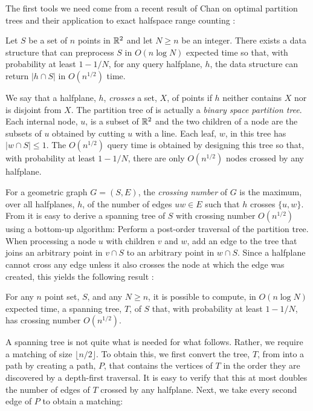 \documentclass{cccg12}
\begin{document}
The first tools we need come from a recent result of Chan on optimal
partition trees and their application to exact halfspace range counting
\cite[Theorems 3.2 and 5.3, with help from Theorem~5.2]{c12}:

\begin{thm}
  Let $S$ be a set of $n$ points in $\mathbb{R}^2$ and let $N\ge n$ be an integer.
  There exists a data structure that can preprocess $S$ in $O(n\log
  N)$ expected time so that, with probability at least $1-1/N$, for
  any query halfplane, $h$, the data structure can return $|h\cap S|$
  in $O(n^{1/2})$ time.
\end{thm}

We say that a halfplane, $h$, \emph{crosses} a set, $X$, of points if
$h$ neither contains $X$ nor is disjoint from $X$.  The partition tree
of  is actually a \emph{binary space
partition tree}.  Each internal node, $u$, is a subset of $\mathbb{R}^2$ and
the two children of a node are the subsets of $u$ obtained by cutting
$u$ with a line.  Each leaf, $w$, in this tree has $|w\cap S| \le 1$.
The $O(n^{1/2})$ query time is obtained by designing this tree so that,
with probability at least $1-1/N$, there are only $O(n^{1/2})$ nodes
crossed by any halfplane.

For a geometric graph $G=(S,E)$, the \emph{crossing number} of $G$ is the
maximum, over all halfplanes, $h$, of the number of edges $uw\in E$ such
that $h$ crosses $\{u,w\}$.  From  it is
easy to derive a spanning tree of $S$ with crossing number $O(n^{1/2})$
using a bottom-up algorithm:  Perform a post-order traversal of the
partition tree.  When processing a node $u$ with children $v$ and $w$,
add an edge to the tree that joins an arbitrary point in $v\cap S$ to
an arbitrary point in $w\cap S$.  Since a halfplane cannot cross any
edge unless it also crosses the node at which the edge was created,
this yields the following result \cite[Corollary~7.1]{c12}:

\begin{thm}
  For any $n$ point set, $S$, and any $N\ge n$, it is possible to compute,
  in $O(n\log N)$ expected time, a spanning tree, $T$, of $S$ that,
  with probability at least $1-1/N$, has crossing number $O(n^{1/2})$.
\end{thm}

A spanning tree is not quite what is needed for what follows.  Rather,
we require a matching of size $\lfloor n/2\rfloor$.  To obtain this,
we first convert the tree, $T$, from  into a path
by creating a path, $P$, that contains the vertices of $T$ in the order
they are discovered by a depth-first traversal.  It is easy to verify that
this at most doubles the number of edges of $T$ crossed by any halfplane.
Next, we take every second edge of $P$ to obtain a matching:
\end{document}
